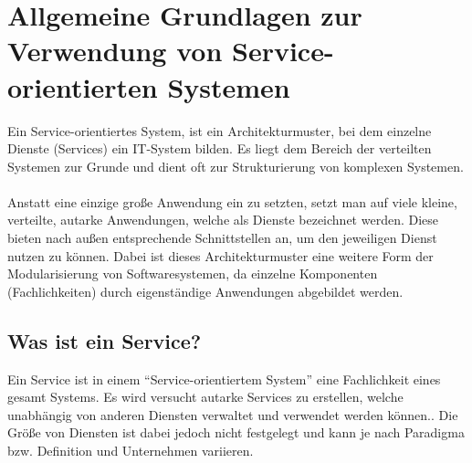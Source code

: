 \chapter[Grundlagen von Service-orientierten Systemen]{Allgemeine Grundlagen zur Verwendung von Service-orientierten Systemen}
\label{chap:Grundlagen}
Ein Service-orientiertes System, ist ein Architekturmuster, bei dem einzelne Dienste (Services) ein IT-System bilden. Es liegt dem Bereich der verteilten Systemen zur Grunde und dient oft zur Strukturierung von komplexen Systemen.
\\\\
Anstatt eine einzige große Anwendung ein zu setzten, setzt man auf viele kleine, verteilte, autarke Anwendungen, welche als Dienste bezeichnet werden. Diese bieten nach außen entsprechende Schnittstellen an, um den jeweiligen Dienst nutzen zu können. Dabei ist dieses Architekturmuster eine weitere Form der Modularisierung von Softwaresystemen, da einzelne Komponenten (Fachlichkeiten) durch eigenständige Anwendungen abgebildet werden.

\section{Was ist ein Service?}
\label{sec:WasIstEinService?}
Ein Service ist in einem "`Service-orientiertem System"' eine Fachlichkeit eines gesamt Systems. Es wird versucht autarke Services zu erstellen, welche unabhängig von anderen Diensten verwaltet und verwendet werden können.. Die Größe von Diensten ist dabei jedoch nicht festgelegt und kann je nach Paradigma bzw. Definition und Unternehmen variieren.

